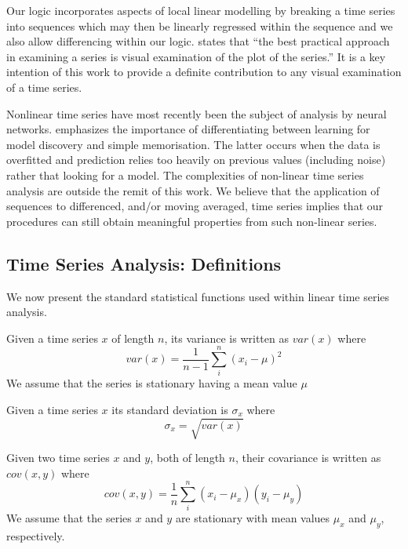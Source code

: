 Our logic incorporates aspects of local linear modelling by breaking a
time series into sequences which may then be linearly regressed within
the sequence and we also allow differencing within our
logic. \cite{naze88} states that ``the best practical approach in
examining a series is visual examination of the plot of the series.''
It is a key intention of this work to provide a definite contribution
to any visual examination of a time series.  

\medskip

Nonlinear time series have most recently been the subject of analysis
by neural networks. \cite{wg94} emphasizes the importance of
differentiating between learning for model discovery and simple
memorisation. The latter occurs when the data is overfitted and
prediction relies too heavily on previous values (including noise)
rather that looking for a model. The complexities of non-linear time
series analysis are outside the remit of this work. We believe that
the application of sequences to differenced, and/or moving averaged,
time series implies that our
procedures can still obtain meaningful properties from such non-linear series.

\subsection{Time Series Analysis: Definitions}\label{subsec:tl_tsadefs}

We now present the standard statistical functions used within linear
time series analysis.

\begin{definition}[Variance]\label{def:var}
\begin{rm}
Given a time series $x$ of length $n$, its variance is written as
$var(x)$ where
\[
var(x) = \frac{1}{n-1} \sum_i^n (x_i - \mu)^2
\]
We assume that the series is stationary having a mean value $\mu$
\end{rm}
\end{definition}


\begin{definition}\label{def:sd}
\begin{rm}
Given a time series $x$ its standard deviation is $\sigma_x$ where 
\[
\sigma_x = \sqrt{var(x)}
\]
\end{rm}
\end{definition}

\begin{definition}[Covariance]\label{def:covar}
\begin{rm}
Given two time series $x$ and $y$, both of length $n$, their
covariance is written as $cov(x,y)$ where
\[
cov(x,y) = \frac{1}{n} \sum_i^n (x_i - \mu_x) (y_i - \mu_y)
\]
We assume that the series $x$ and $y$ are stationary with mean values
$\mu_x$ and $\mu_y$, respectively.
\end{rm}
\end{definition}

